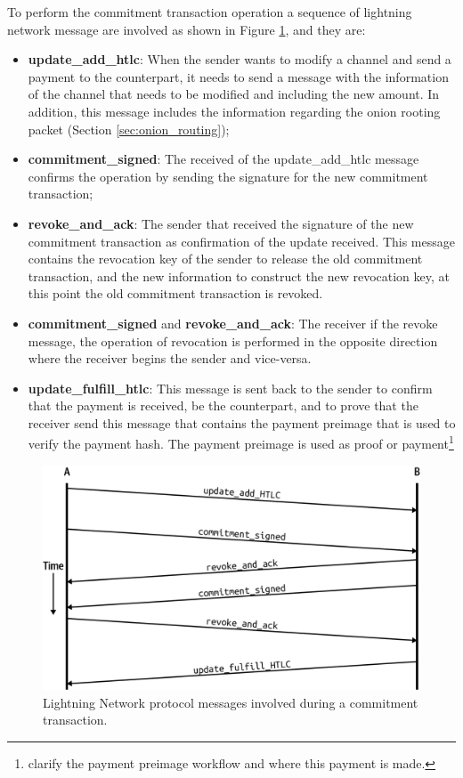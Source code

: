 To perform the commitment transaction operation a sequence of lightning network message are involved as shown in Figure \ref{fig:commitment_transaction_ln_messages}, and they are:

\begin{itemize}
  \item {\bf update\_add\_htlc}: When the sender wants to modify a channel and send a payment to the counterpart, it needs to send a message with the information of the channel that needs to be modified and including the new amount. In addition, this message includes
  the information regarding the onion rooting packet (Section \ref{sec:onion_routing});
  \item {\bf commitment\_signed}: The received of the update\_add\_htlc message confirms the operation by sending the signature for the new commitment transaction;
  \item {\bf revoke\_and\_ack}: The sender that received the signature of the new commitment transaction as confirmation of the update received. This message contains the revocation key of the sender to release the old commitment transaction, and the new information to construct the new revocation key, at this point the old commitment transaction is revoked.
  \item {\bf commitment\_signed} and {\bf revoke\_and\_ack}: The receiver if the revoke message, the operation of revocation is performed in the opposite direction where the receiver begins the sender and vice-versa.
  \item {\bf update\_fulfill\_htlc}: This message is sent back to the sender to confirm that the payment is received, 
      be the counterpart, and to prove that the receiver send this message that contains the payment preimage 
        that is used to verify the payment hash. The payment preimage is used as proof or payment\footnote{clarify the payment preimage workflow and where this payment is made.}
\end{itemize}


\begin{figure}[h]
  \begin{center}
  \includegraphics[width=0.6\columnwidth]{imgs/mtln_0903.png}
  \end{center}
  \caption{Lightning Network protocol messages involved during a commitment transaction.}
  \label{fig:commitment_transaction_ln_messages}
\end{figure}


